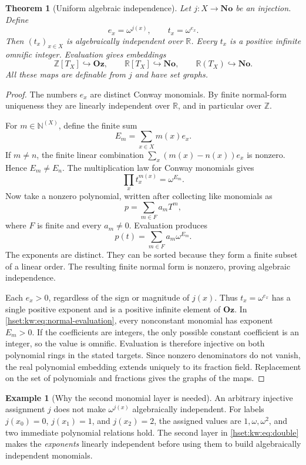 \documentclass[11pt,letterpaper]{article}
\newtheorem{theorem}{Theorem}[section]
\theoremstyle{definition}
\newtheorem{example}[example]{Example}\aliascntresetthe{example}
\theoremstyle{remark}
\newcommand{\No}{\mathbf{No}}
\newcommand{\Oz}{\mathbf{Oz}}
\newcommand{\R}{\mathbb R}
\newcommand{\Z}{\mathbb Z}
\newcommand{\N}{\mathbb N}
\begin{document}
\begin{theorem}[Uniform algebraic independence]\label{hset:kw:thm:double}
Let $j:X\to\No$ be an injection. Define
\begin{equation}\label{hset:kw:eq:double}
e_x=\omega^{j(x)},\qquad t_x=\omega^{e_x}.
\end{equation}
Then $(t_x)_{x\in X}$ is algebraically independent over $\R$. Every $t_x$ is a positive infinite omnific integer. Evaluation gives embeddings
\[
\Z[T_X]\hookrightarrow\Oz,
\qquad
\R[T_X]\hookrightarrow\No,
\qquad
\R(T_X)\hookrightarrow\No.
\]
All these maps are definable from $j$ and have set graphs.
\end{theorem}
\begin{proof}
The numbers $e_x$ are distinct Conway monomials. By finite normal-form uniqueness they are linearly independent over $\R$, and in particular over $\Z$.

For $m\in\N^{(X)}$, define the finite sum
\[
E_m=\sum_{x\in X}m(x)e_x.
\]
If $m\ne n$, the finite linear combination $\sum_x(m(x)-n(x))e_x$ is nonzero. Hence $E_m\ne E_n$. The multiplication law for Conway monomials gives
\[
\prod_x t_x^{m(x)}=\omega^{E_m}.
\]
Now take a nonzero polynomial, written after collecting like monomials as
\[
p=\sum_{m\in F}a_mT^m,
\]
where $F$ is finite and every $a_m\ne0$. Evaluation produces
\begin{equation}\label{hset:kw:eq:normal-evaluation}
p(t)=\sum_{m\in F}a_m\omega^{E_m}.
\end{equation}
The exponents are distinct. They can be sorted because they form a finite subset of a linear order. The resulting finite normal form is nonzero, proving algebraic independence.

Each $e_x>0$, regardless of the sign or magnitude of $j(x)$. Thus $t_x=\omega^{e_x}$ has a single positive exponent and is a positive infinite element of $\Oz$. In \eqref{hset:kw:eq:normal-evaluation}, every nonconstant monomial has exponent $E_m>0$. If the coefficients are integers, the only possible constant coefficient is an integer, so the value is omnific. Evaluation is therefore injective on both polynomial rings in the stated targets. Since nonzero denominators do not vanish, the real polynomial embedding extends uniquely to its fraction field. Replacement on the set of polynomials and fractions gives the graphs of the maps.
\end{proof}

\begin{example}[Why the second monomial layer is needed]
An arbitrary injective assignment $j$ does not make $\omega^{j(x)}$ algebraically independent. For labels $j(x_0)=0$, $j(x_1)=1$, and $j(x_2)=2$, the assigned values are $1,\omega,\omega^2$, and two immediate polynomial relations hold. The second layer in \eqref{hset:kw:eq:double} makes the \emph{exponents} linearly independent before using them to build algebraically independent monomials.
\end{example}
\end{document}
